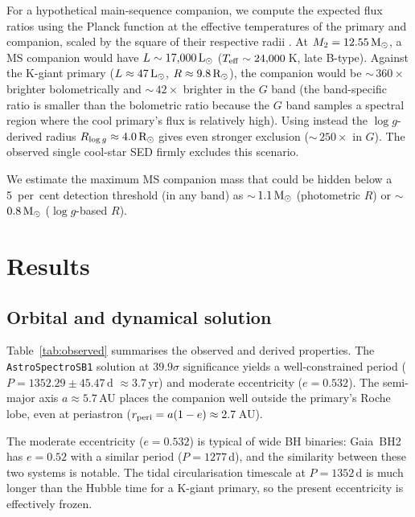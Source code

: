 \documentclass[usenatbib,fleqn]{mnras}
\newcommand{\Msun}{{\rm M}_\odot}
\newcommand{\Lsun}{{\rm L}_\odot}
\newcommand{\Rsun}{{\rm R}_\odot}
\begin{document}
For a hypothetical main-sequence companion, we compute the expected
flux ratios using the Planck function at the effective temperatures
of the primary and companion, scaled by the square of their
respective radii \citep{Eker2018}.  At $M_2 = 12.55\,\Msun$, a
MS companion would have $L \sim 17{,}000\,\Lsun$
($T_{\rm eff} \sim 24{,}000$\,K, late B-type).  Against the
K-giant primary ($L \approx 47\,\Lsun$, $R \approx 9.8\,\Rsun$),
the companion would be $\sim$\,$360\times$ brighter
bolometrically and $\sim$\,$42\times$ brighter in the $G$ band
(the band-specific ratio is smaller than the bolometric ratio
because the $G$ band samples a spectral region where the
cool primary's flux is relatively high).  Using instead the
$\log g$-derived radius $R_{\log g} \approx 4.0\,\Rsun$ gives
even stronger exclusion ($\sim$\,$250\times$ in $G$).
The observed single cool-star SED firmly excludes this scenario.

We estimate the maximum MS companion mass that could be hidden
below a 5~per~cent detection threshold (in any band) as
$\sim$\,$1.1\,\Msun$ (photometric $R$) or
$\sim$\,$0.8\,\Msun$ ($\log g$-based $R$).

\section{Results}
\label{sec:results}

\subsection{Orbital and dynamical solution}
\label{sec:results:orbit}

Table~\ref{tab:observed} summarises the observed and derived
properties.  The \texttt{AstroSpectroSB1} solution at $39.9\sigma$
significance yields a well-constrained period
($P = 1352.29 \pm 45.47$\,d $\approx 3.7$\,yr) and moderate
eccentricity ($e = 0.532$).  The semi-major axis
$a \approx 5.7$\,AU places the companion well outside the
primary's Roche lobe, even at periastron
($r_{\rm peri} = a(1-e) \approx 2.7$\,AU).

The moderate eccentricity ($e = 0.532$) is typical of wide
BH binaries: Gaia~BH2 has $e = 0.52$ with a similar period
($P = 1277$\,d), and the similarity between these two systems is
notable.  The tidal circularisation timescale at $P = 1352$\,d is
much longer than the Hubble time for a K-giant primary, so the
present eccentricity is effectively frozen.
\end{document}
